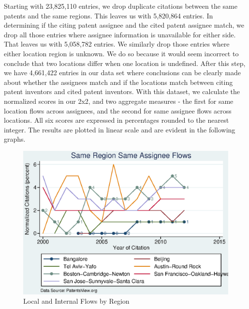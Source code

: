 \documentclass[12pt]{article}
\begin{document}
Starting with 23,825,110 entries, we drop duplicate citations between the same patents and the same regions. This leaves us with 5,820,864 entries. In determining if the citing patent assignee and the cited patent assignee match, we drop all those entries where assignee information is unavailable for either side. That leaves us with  5,058,782 entries. We similarly drop those entries where either location region is unknown. We do so because it would seem incorrect to conclude that two locations differ when one location is undefined. After this step, we have 4,661,422 entries in our data set where conclusions can be clearly made about whether the assignees match and if the locations match between citing patent inventors and cited patent inventors. With this dataset, we calculate the normalized scores in our 2x2, and two aggregate measures - the first for same location flows across assignees, and the second for same assignee flows across locations. All six scores are expressed in percentages rounded to the nearest integer. The results are plotted in linear scale and are evident in the following graphs.



\begin{figure}[h]
\begin{centering}
  \includegraphics[width=\textwidth]{SameRegionSameAssigneeFlows}
  \caption{Local and Internal Flows by Region}
  \label{fig:SameRegionSameAssigneeFlows}
\end{centering}
\end{figure}
\end{document}
